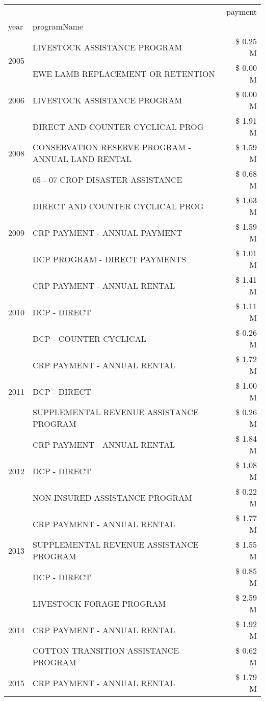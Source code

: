 \begin{tabular}{llr}
\toprule
 &  & payment \\
year & programName &  \\
\midrule
\multirow[t]{2}{*}{2005} & LIVESTOCK ASSISTANCE PROGRAM & \$ 0.25 M \\
 & EWE LAMB REPLACEMENT OR RETENTION & \$ 0.00 M \\
\cline{1-3}
2006 & LIVESTOCK ASSISTANCE PROGRAM & \$ 0.00 M \\
\cline{1-3}
\multirow[t]{3}{*}{2008} & DIRECT AND COUNTER CYCLICAL PROG & \$ 1.91 M \\
 & CONSERVATION RESERVE PROGRAM - ANNUAL LAND RENTAL & \$ 1.59 M \\
 & 05 - 07 CROP DISASTER ASSISTANCE & \$ 0.68 M \\
\cline{1-3}
\multirow[t]{3}{*}{2009} & DIRECT AND COUNTER CYCLICAL PROG & \$ 1.63 M \\
 & CRP PAYMENT - ANNUAL PAYMENT & \$ 1.59 M \\
 & DCP PROGRAM - DIRECT PAYMENTS & \$ 1.01 M \\
\cline{1-3}
\multirow[t]{3}{*}{2010} & CRP PAYMENT - ANNUAL RENTAL & \$ 1.41 M \\
 & DCP - DIRECT & \$ 1.11 M \\
 & DCP - COUNTER CYCLICAL & \$ 0.26 M \\
\cline{1-3}
\multirow[t]{3}{*}{2011} & CRP PAYMENT - ANNUAL RENTAL & \$ 1.72 M \\
 & DCP - DIRECT & \$ 1.00 M \\
 & SUPPLEMENTAL REVENUE ASSISTANCE PROGRAM & \$ 0.26 M \\
\cline{1-3}
\multirow[t]{3}{*}{2012} & CRP PAYMENT - ANNUAL RENTAL & \$ 1.84 M \\
 & DCP - DIRECT & \$ 1.08 M \\
 & NON-INSURED ASSISTANCE PROGRAM & \$ 0.22 M \\
\cline{1-3}
\multirow[t]{3}{*}{2013} & CRP PAYMENT - ANNUAL RENTAL & \$ 1.77 M \\
 & SUPPLEMENTAL REVENUE ASSISTANCE PROGRAM & \$ 1.55 M \\
 & DCP - DIRECT & \$ 0.85 M \\
\cline{1-3}
\multirow[t]{3}{*}{2014} & LIVESTOCK FORAGE PROGRAM & \$ 2.59 M \\
 & CRP PAYMENT - ANNUAL RENTAL & \$ 1.92 M \\
 & COTTON TRANSITION ASSISTANCE PROGRAM & \$ 0.62 M \\
\cline{1-3}
\multirow[t]{3}{*}{2015} & CRP PAYMENT - ANNUAL RENTAL & \$ 1.79 M \\

\end{tabular}
